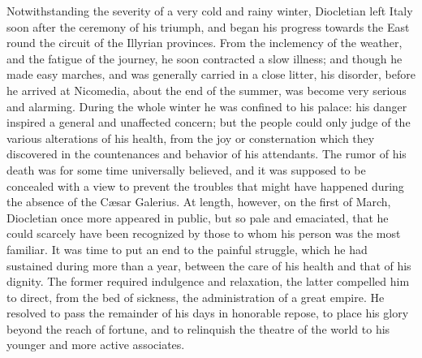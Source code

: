 Notwithstanding the severity of a very cold and rainy winter,
Diocletian left Italy soon after the ceremony of his triumph, and
began his progress towards the East round the circuit of the
Illyrian provinces. From the inclemency of the weather, and the
fatigue of the journey, he soon contracted a slow illness; and
though he made easy marches, and was generally carried in a close
litter, his disorder, before he arrived at Nicomedia, about the
end of the summer, was become very serious and alarming. During
the whole winter he was confined to his palace: his danger
inspired a general and unaffected concern; but the people could
only judge of the various alterations of his health, from the joy
or consternation which they discovered in the countenances and
behavior of his attendants. The rumor of his death was for some
time universally believed, and it was supposed to be concealed
with a view to prevent the troubles that might have happened
during the absence of the Cæsar Galerius. At length, however, on
the first of March, Diocletian once more appeared in public, but
so pale and emaciated, that he could scarcely have been
recognized by those to whom his person was the most familiar. It
was time to put an end to the painful struggle, which he had
sustained during more than a year, between the care of his health
and that of his dignity. The former required indulgence and
relaxation, the latter compelled him to direct, from the bed of
sickness, the administration of a great empire. He resolved to
pass the remainder of his days in honorable repose, to place his
glory beyond the reach of fortune, and to relinquish the theatre
of the world to his younger and more active associates.\footnotemark[108]



